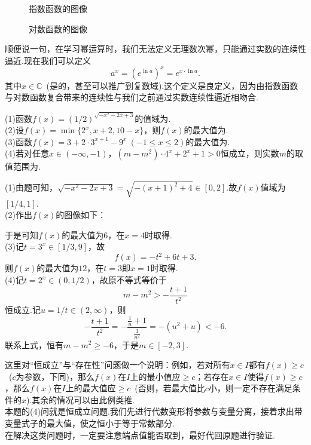 \documentclass[lang=cn, zihao=5]{elegantbook}
\newcommand{\ssb}[1]{\left( #1 \right)}
\newcommand{\C}{\mathbb{C}}
\newcommand{\tk}{\uline{\hspace{4em}}}
\begin{document}
\begin{figure}[h!]
	\centering
	
	\caption{指数函数的图像}
\end{figure}

\begin{figure}[h!]
	\centering
	
	\caption{对数函数的图像}
\end{figure}

顺便说一句，在学习幂运算时，我们无法定义无理数次幂，只能通过实数的连续性逼近.现在我们可以定义$$a^x = \ssb{e ^{\ln a}}^x = e^{x \cdot \ln a}.$$
\newpage \noindent
其中$x \in \C$~(是的，甚至可以推广到复数域).这个定义是良定义，因为由指数函数与对数函数复合带来的连续性与我们之前通过实数连续性逼近相吻合.

\begin{example}
	(1)函数$f(x)=\ssb{1/2}^{\sqrt{-x^2-2x+3}}$的值域为\tk . \\
	(2)设$f(x)=\min \{ 2^x,x+2,10-x \}$，则$f(x)$的最大值为\tk . \\
	(3)函数$f(x)=3+2 \cdot 3^{x+1} - 9^x~(-1 \leq x \leq 2)$的最大值为\tk . \\
	(4)若对任意$x \in (-\infty ,-1)$，$(m-m^2) \cdot 4^x + 2^x + 1 >0$恒成立，则实数$m$的取值范围为\tk .
\end{example}
\begin{solution}
	(1)由题可知，$\sqrt{-x^2-2x+3} = \sqrt{-(x+1)^2 + 4} \in [0,2]$.故$f(x)$值域为$[1/4,1]$. \\
	(2)作出$f(x)$的图像如下：
	\begin{figure}[h!]
		\centering
		
	\end{figure}
	于是可知$f(x)$的最大值为$6$，在$x=4$时取得. \\
	(3)记$t=3^x \in [1/3,9]$，故$$f(x) = -t^2 + 6t + 3.$$
	则$f(x)$的最大值为$12$，在$t=3$即$x=1$时取得. \\
	(4)记$t=2^x \in (0,1/2)$，故原不等式等价于$$m-m^2 > -\frac{t+1}{t^2}$$恒成立.记$u=1/t \in (2, \infty)$，则$$-\frac{t+1}{t^2} = -\frac{\frac{1}{u}+1}{\frac{1}{u^2}} = -(u^2+u) < -6.$$
	联系上式，恒有$m-m^2 \geq -6$，于是$m \in [-2,3]$.
\end{solution}

\begin{remark}
	这里对“恒成立”与“存在性”问题做一个说明：例如，若对所有$x \in I$都有$f(x) \geq c$~($c$为参数，下同)，那么$f(x)$在$I$上的最小值应$\geq c$；若存在$x \in I$使得$f(x) \geq c$，那么$f(x)$在$I$上的最大值应$\geq c$~(否则，若最大值比$c$小，则一定不存在满足条件的$x$).其余的情况可以由此例类推. \\
	本题的(4)问就是恒成立问题.我们先进行代数变形将参数与变量分离，接着求出带变量式子的最大值，使之恒小于等于常数部分. \\
	在解决这类问题时，一定要注意端点值能否取到，最好代回原题进行验证.
\end{remark}
\end{document}

